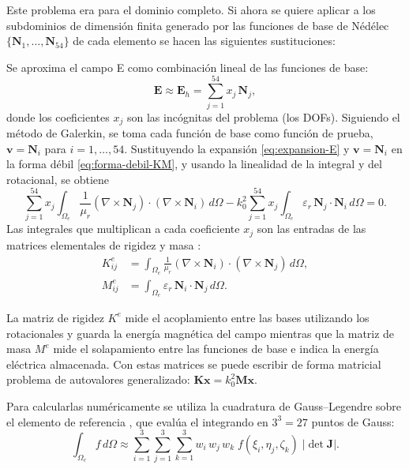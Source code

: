 \documentclass[12pt]{report} %
\begin{document}
Este problema era para el dominio completo. Si ahora se quiere aplicar a los subdominios de dimensión finita generado por las funciones de base de Nédélec $\{\mathbf{N}_1,\dots,\mathbf{N}_{54}\}$ de cada elemento se hacen las siguientes sustituciones:

Se aproxima el campo E como combinación lineal de las funciones de base:
\begin{equation}\label{eq:expansion-E}
	\mathbf{E}\approx\mathbf{E}_h=\sum_{j=1}^{54} x_j\,\mathbf{N}_j,
\end{equation}
donde los coeficientes $x_j$ son las incógnitas del problema (los DOFs). Siguiendo el método de Galerkin, se toma cada función de base como función de prueba, $\mathbf{v}=\mathbf{N}_i$ para $i=1,\dots,54$. Sustituyendo la expansión \eqref{eq:expansion-E} y $\mathbf{v}=\mathbf{N}_i$ en la forma débil \eqref{eq:forma-debil-KM}, y usando la linealidad de la integral y del rotacional, se obtiene
\begin{equation}\label{eq:sustitucion}
	\sum_{j=1}^{54} x_j \int_{\Omega_e} \frac{1}{\mu_r}
	(\nabla\times\mathbf{N}_j)\cdot(\nabla\times\mathbf{N}_i)\,d\Omega
	- k_0^2 \sum_{j=1}^{54} x_j \int_{\Omega_e} \varepsilon_r\,
	\mathbf{N}_j\cdot\mathbf{N}_i\,d\Omega = 0 .
\end{equation}
Las integrales que multiplican a cada coeficiente $x_j$ son las entradas de las matrices elementales de rigidez y masa \cite{monk2003, jin2015}:
\begin{align}
	K^e_{ij} &= \int_{\Omega_e} \frac{1}{\mu_r}
	(\nabla\times\mathbf{N}_i)\cdot(\nabla\times\mathbf{N}_j)\, d\Omega, \label{eq:Ke}\\
	M^e_{ij} &= \int_{\Omega_e} \varepsilon_r\,
	\mathbf{N}_i\cdot\mathbf{N}_j\, d\Omega. \label{eq:Me}
\end{align}

La matriz de rigidez $K^e$ mide el acoplamiento entre las bases utilizando los rotacionales y guarda la energía magnética del campo mientras que la matriz de masa $M^e$ mide el solapamiento entre las funciones de base e indica la energía eléctrica almacenada. Con estas matrices se puede escribir de forma matricial problema de autovalores generalizado: $\mathbf{K}\mathbf{x}=k_0^2\mathbf{M}\mathbf{x}$.


 Para calcularlas numéricamente se utiliza la cuadratura de Gauss--Legendre sobre el elemento de referencia \cite{jin2015}, que evalúa el integrando en $3^3=27$ puntos de Gauss:
\begin{equation}\label{eq:cuadratura}
	\int_{\Omega_e} f\,d\Omega \approx \sum_{i=1}^{3}\sum_{j=1}^{3}\sum_{k=1}^{3}
	w_i\,w_j\,w_k\; f(\xi_i,\eta_j,\zeta_k)\; |\det\mathbf{J}|.
\end{equation}
\end{document}
